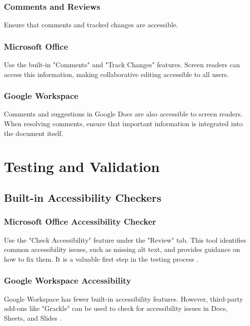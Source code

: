 \subsubsection{Comments and Reviews}\label{ch15:sssec:comments-reviews}
Ensure that comments and tracked changes are accessible.

\subsubsection{Microsoft Office}\label{ch15:sssec:office-comments}
Use the built-in "Comments" and "Track Changes" features. Screen readers can access this information, making collaborative editing accessible to all users.

\subsubsection{Google Workspace}\label{ch15:sssec:google-comments}
Comments and suggestions in Google Docs are also accessible to screen readers. When resolving comments, ensure that important information is integrated into the document itself.

\section{Testing and Validation}\label{ch15:sec:testing-validation}

\subsection{Built-in Accessibility Checkers}\label{ch15:ssec:a11y-checkers}

\subsubsection{Microsoft Office Accessibility Checker}\label{ch15:sssec:office-a11y-checker}
Use the "Check Accessibility" feature under the "Review" tab. This tool identifies common accessibility issues, such as missing alt text, and provides guidance on how to fix them. It is a valuable first step in the testing process \supercite{MicrosoftAccessibility}.

\subsubsection{Google Workspace Accessibility}\label{ch15:sssec:google-a11y-checker}
Google Workspace has fewer built-in accessibility features. However, third-party add-ons like "Grackle" can be used to check for accessibility issues in Docs, Sheets, and Slides \supercite{GrackleDocs}.

